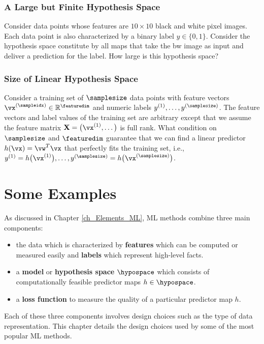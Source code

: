 \documentclass[12pt]{report}
\newcommand{\featurelen}{\featuredim}
\begin{document}
 \subsection{A Large but Finite Hypothesis Space} 
\label{ex_2_8}
Consider data points whose features are $10 \times 10$ black and white pixel images. 
Each data point is also characterized by a binary label $y \in \{0,1\}$. Consider the 
hypothesis space constitute by all maps that take the bw image as input and deliver 
a prediction for the label. How large is this hypothesis space? 

\subsection{Size of Linear Hypothesis Space} 
\label{ex_size_lin_hypospace} 
Consider a training set of $\samplesize$ data points with feature 
vectors $\vx^{(\sampleidx)} \in \mathbb{R}^{\featuredim}$ and 
numeric labels $y^{(1)},\ldots,y^{(\samplesize)}$. The feature vectors 
and label values of the training set are arbitrary except that we assume 
the feature matrix $\mathbf{X} = \big(\vx^{(1)},\ldots \big)$ is full rank. 
What condition on $\samplesize$ and $\featurelen$ guarantee that we 
can find a linear predictor $h(\vx) = \vw^{T} \vx$ that perfectly fits the 
training set, i.e., $y^{(1)} = h\big(\vx^{(1)} \big),\ldots, y^{(\samplesize)} = h\big(\vx^{(\samplesize)} \big)$. 


\newpage
\chapter{Some Examples} 
\label{ch_some_examples}
As discussed in Chapter \ref{ch_Elements_ML}, ML methods combine 
three main components: 
\begin{itemize} 
\item the data which is characterized by {\bf features} which can be computed 
or measured easily and {\bf labels} which represent high-level facts. 
\item a {\bf model} or {\bf hypothesis space} $\hypospace$ which consists of 
computationally feasible predictor maps $h \in \hypospace$. 
\item a {\bf loss function} to measure the quality of a particular predictor map $h$. 
\end{itemize} 
Each of these three components involves design choices such as the type of 
data representation. This chapter details the design choices used by some of the 
most popular ML methods. 
\end{document}
